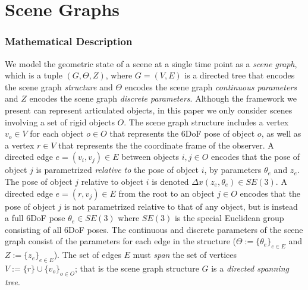 \chapter{Scene Graphs}

\subsection{Mathematical Description}

We model the geometric state of a scene at a single time point as a \emph{scene graph}, which is a tuple $(G, \Theta, Z)$, where $G = (V, E)$ is a directed tree that encodes the scene graph \emph{structure} and $\Theta$ encodes the scene graph \emph{continuous parameters} and $Z$ encodes the scene graph \emph{discrete parameters}.
Although the framework we present can represent articulated objects, in this paper we only consider scenes involving a set of rigid objects $O$.
The scene graph structure includes a vertex $v_o \in V$ for each object $o \in O$ that represents the 6DoF pose of object $o$, as well as a vertex $r \in V$ that represents the the coordinate frame of the observer.
A directed edge $e = (v_i, v_j) \in E$ between objects $i, j \in O$ encodes that the pose of object $j$ is parametrized \emph{relative to} the pose of object $i$, by parameters $\theta_e$ and $z_e$.
The pose of object $j$ relative to object $i$ is denoted $\Delta x(z_e, \theta_e) \in SE(3)$.
A directed edge $e = (r, v_j) \in E$ from the root to an object $j \in O$ encodes that the pose of object $j$ is not parametrized relative to that of any object, but is instead a full 6DoF pose $\theta_e \in SE(3)$ where $SE(3)$ is the special Euclidean group consisting of all 6DoF poses.
The continuous and discrete parameters of the scene graph consist of the parameters for each edge in the structure ($\Theta := \{\theta_e\}_{e \in E}$ and $Z := \{z_e\}_{e \in E}$).
The set of edges $E$ must \emph{span} the set of vertices $V := \{r\} \cup \{v_o\}_{o \in O}$; that is the scene graph structure $G$ is a \emph{directed spanning tree}.

